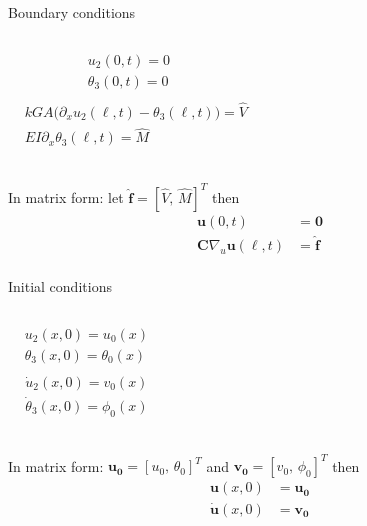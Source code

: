 \documentclass[aspectratio=169]{beamer}
\begin{document}
\begin{frame}
  \begin{block}{Boundary conditions}
    \begin{columns}
      \[
        \begin{aligned}
           & u_2(0, t) = 0 \quad        &  & \\
           & \theta_{3}(0, t) = 0 \quad &  & \\
        \end{aligned}
      \]
      \[
        \begin{aligned}
           & kGA \big(\partial_{x}u_{2}(\ell, t)-\theta_{3}(\ell, t) \big)= \hat V &  & \\
           & EI \partial_{x}\theta_{3}(\ell, t)=\hat M                             &  & \\
        \end{aligned}
      \]
    \end{columns}
    \vspace{.2cm}\small In matrix form: let $\hat{\mathbf{f}}=[\hat V,\, \hat M]^T$ then
    $$\begin{aligned}
        \mathbf u(0,t)                        & =\mathbf 0       \\
        \mathbf C\nabla_{u} \mathbf u(\ell,t) & =\mathbf{\hat f} \\
      \end{aligned}$$
  \end{block}

  \begin{block}{Initial conditions}
    \begin{columns}
      \[
        \begin{aligned}
           & u_2(x, 0) = u_{0}(x) \quad             &  & \\
           & \theta_{3}(x, 0) = \theta_{0}(x) \quad &  & \\
        \end{aligned}
      \]
      \[
        \begin{aligned}
           & \dot u_2(x, 0) = v_{0}(x) \quad           &  & \\
           & \dot \theta_{3}(x, 0) = \phi_{0}(x) \quad &  & \\
        \end{aligned}
      \]
    \end{columns}
    \vspace{.2cm}\small In matrix form:  $\mathbf{u_{0}}=[u_0,\, \theta_0]^T$ and $\mathbf{v_{0}}=[v_0,\, \phi_0]^T$ then
    $$\begin{aligned}
        \mathbf u(x,0)       & =\mathbf{u_{0}} \\
        \mathbf{\dot u}(x,0) & =\mathbf{v_{0}}
      \end{aligned}$$
  \end{block}
\end{frame}
\end{document}
